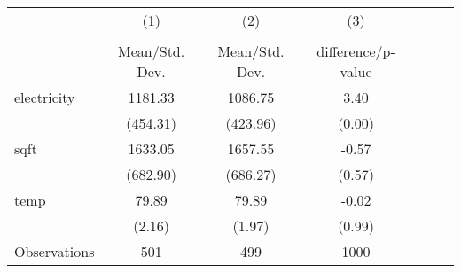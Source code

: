 {
\def\sym#1{\ifmmode^{#1}\else\(^{#1}\)\fi}
\begin{tabular}{l*{3}{cc}}
\hline\hline
                    &\multicolumn{1}{c}{(1)}&\multicolumn{1}{c}{(2)}&\multicolumn{1}{c}{(3)}\\
                    &\multicolumn{1}{c}{}&\multicolumn{1}{c}{}&\multicolumn{1}{c}{}\\
                    &Mean/Std. Dev.&Mean/Std. Dev.&difference/p-value\\
\hline
electricity         &     1181.33&     1086.75&        3.40\\
                    &    (454.31)&    (423.96)&      (0.00)\\
sqft                &     1633.05&     1657.55&       -0.57\\
                    &    (682.90)&    (686.27)&      (0.57)\\
temp                &       79.89&       79.89&       -0.02\\
                    &      (2.16)&      (1.97)&      (0.99)\\
\hline
Observations        &         501&         499&        1000\\
\hline\hline
\end{tabular}
}
